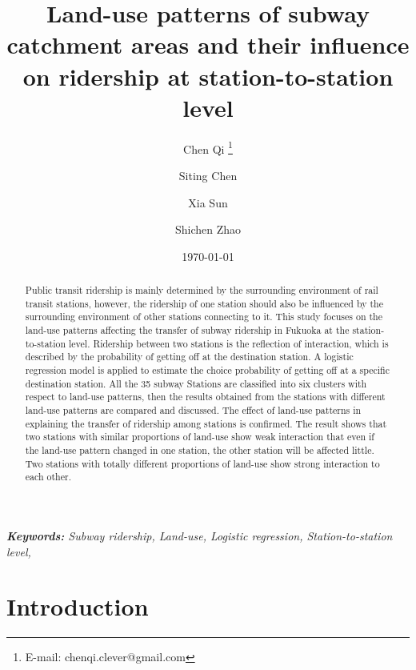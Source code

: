 \documentclass[utf8]{article}
\begin{document}
\title{Land-use patterns of subway catchment areas and their influence on ridership at station-to-station level}

\author{Chen Qi \thanks{E-mail: chenqi.clever@gmail.com} \and Siting Chen \and Xia Sun \and Shichen Zhao}
\date{\today}
\maketitle

%
\begin{abstract}
\noindent
Public transit ridership is mainly determined by the surrounding environment of rail transit stations, however, the ridership of one station should also be influenced by the surrounding environment of other stations connecting to it. This study focuses on the land-use patterns affecting the transfer of subway ridership in Fukuoka at the station-to-station level. Ridership between two stations is the reflection of interaction, which is described by the probability of getting off at the destination station. A logistic regression model is applied to estimate the choice probability of getting off at a specific destination station. All the 35 subway Stations are classified into six clusters with respect to land-use patterns, then the results obtained from the stations with different land-use patterns are compared and discussed. The effect of land-use patterns in explaining the transfer of ridership among stations is confirmed. The result shows that two stations with similar proportions of land-use show weak interaction that even if the land-use pattern changed in one station, the other station will be affected little. Two stations with totally different proportions of land-use show strong interaction to each other.

\end{abstract}

%
\begin{center}
{\slshape \textbf{Keywords:} Subway ridership, Land-use, Logistic regression, Station-to-station level, }
\end{center}

%
\section{Introduction}
\indent
\end{document}
